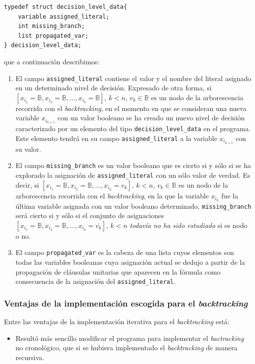 \documentclass[12pt,lettersize,oneside]{article}
\begin{document}
\begin{lstlisting}
typedef struct decision_level_data{
    variable assigned_literal;
    int missing_branch;                                                
    list propagated_var;
} decision_level_data;
\end{lstlisting}
que a continuación describimos:
\vspace{-2.5mm}
\begin{enumerate}
\item El campo {\tt assigned\_literal} contiene el valor y el nombre del literal
  asignado en un determinado nivel de decisión. Expresado de otra forma,  si
  $[x_{i_1}=\mathbb{B},x_{i_2}=\mathbb{B},\ldots, x_{i_k} = \mathbb{B} ]$, $k< n$, $v_k
  \in \mathbb{B}$ es un nodo de la arborescencia recorrida con el
  \emph{backtracking}, en el momento en que se consideran una nueva variable
  $x_{i_{k+1}}$ con un valor booleano se ha creado un nuevo nivel de decisión
  caracterizado por un elemento del tipo {\tt decision\_level\_data} en el
  programa. Este elemento tendrá en su campo {\tt assigned\_literal} a la
  variable $x_{i_{k+1}}$ con su valor.
\item El campo {\tt missing\_branch} es un valor booleano que es cierto si y
  sólo si se ha explorado la asignación de {\tt assigned\_literal} con un
  sólo valor de verdad. Es decir, si
  $[x_{i_1}=\mathbb{B},x_{i_2}=\mathbb{B},\ldots, x_{i_k} = v_k ]$, $k< n$, $v_k
  \in \mathbb{B}$ es un nodo de la arborescencia recorrida con el
  \emph{backtracking}, en la que la variable $x_{i_k}$ fue la última variable
  asignada con un valor booleano determinado, {\tt missing\_branch} será cierto
  si y sólo si el conjunto de asignaciones
  $[x_{i_1}=\mathbb{B},x_{i_2}=\mathbb{B},\ldots, x_{i_k} = \overline{v_k} ]$,
  $k<n$ \emph{todavía no ha sido estudiado} si es nodo o no.
\item El campo {\tt propagated\_var} es la cabeza de una lista cuyos elementos
  son todas las variables booleanas cuya asignación actual se dedujo a partir de
  la propagación de cláusulas unitarias que aparecen en la fórmula como
  consecuencia de la asignación del {\tt assigned\_literal}.
\end{enumerate}

\subsubsection{Ventajas de la implementación escogida para el
  \emph{backtracking}}\label{VentajasBacktracking}
Entre las ventajas de la implementación iterativa para el \emph{backtracking} está:
\vspace{-2.5mm}
\begin{itemize}
  \item Resultó más sencillo modificar el programa para implementar el
    \emph{bactracking} no cronológico, que si se hubiera implementado el
    \emph{backtracking} de manera recursiva.
\end{itemize}
\end{document}
